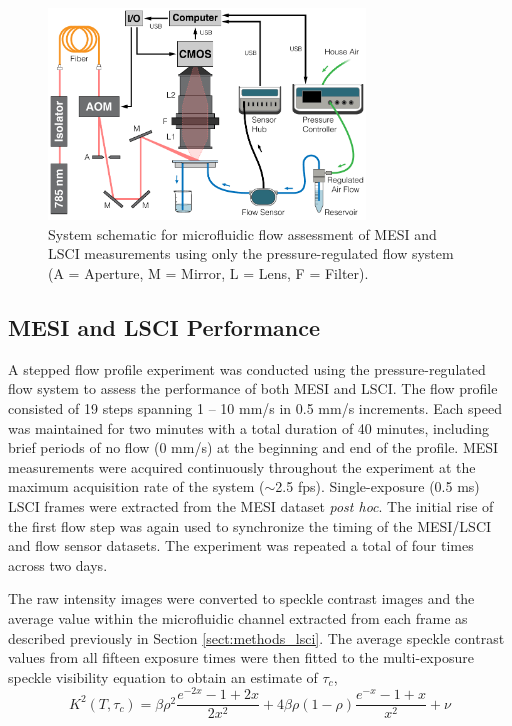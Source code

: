\documentclass[12pt]{spieman}
\begin{document}
\begin{spacing}{2}
\begin{figure}
    \centering
    \includegraphics[width=0.75\textwidth]{Figure3.pdf}
    \caption {
        System schematic for microfluidic flow assessment of MESI and LSCI measurements using only the pressure-regulated flow system (A = Aperture, M = Mirror, L = Lens, F = Filter).
    }
    \label{fig:system_mesi}
\end{figure}


\subsection{MESI and LSCI Performance}

A stepped flow profile experiment was conducted using the pressure-regulated flow system to assess the performance of both MESI and LSCI. The flow profile consisted of 19 steps spanning 1 -- 10 mm/s in 0.5 mm/s increments. Each speed was maintained for two minutes with a total duration of 40 minutes, including brief periods of no flow (0 mm/s) at the beginning and end of the profile. MESI measurements were acquired continuously throughout the experiment at the maximum acquisition rate of the system ($\sim$2.5 fps). Single-exposure (0.5 ms) LSCI frames were extracted from the MESI dataset \textit{post hoc}. The initial rise of the first flow step was again used to synchronize the timing of the MESI/LSCI and flow sensor datasets. The experiment was repeated a total of four times across two days.

The raw intensity images were converted to speckle contrast images and the average value within the microfluidic channel extracted from each frame as described previously in Section \ref{sect:methods_lsci}. The average speckle contrast values from all fifteen exposure times were then fitted to the multi-exposure speckle visibility equation \cite{Parthasarathy:2008el} to obtain an estimate of $\tau_c$,
%
\begin{equation}
    \label{eq:mesi}
    K^2(T,\tau_c) =
        \beta\rho^2\frac{e^{-2x} - 1 + 2x}{2x^2} +
        4\beta\rho(1 - \rho)\frac{e^{-x} - 1 + x}{x^2} +
        \nu
\end{equation}


\end{spacing}
\end{document}
